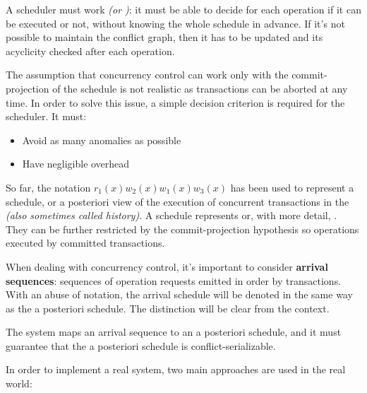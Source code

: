 \documentclass[english]{article}
\begin{document}
A scheduler must work  \textit{(or )}: it must be able to decide for each operation if it can be executed or not, without knowing the whole schedule in advance.
If it's not possible to maintain the conflict graph, then it has to be updated and its acyclicity checked after each operation.

The assumption that concurrency control can work only with the commit-projection of the schedule is not realistic as transactions can be aborted at any time.
In order to solve this issue, a simple decision criterion is required for the scheduler.
It must:

\begin{itemize}
  \item Avoid as many anomalies as possible
  \item Have negligible overhead
\end{itemize}

So far, the notation \(r_1(x) w_2(x) w_1(x) w_3(x)\) has been used to represent a schedule, or a posteriori view of the execution of concurrent transactions in the \DBMS \textit{(also sometimes called history)}.
A schedule represents  or, with more detail, .
They can be further restricted by the commit-projection hypothesis so operations executed by committed transactions.

When dealing with concurrency control, it's important to consider \textbf{arrival sequences}: sequences of operation requests emitted in order by transactions.
With an abuse of notation, the arrival schedule will be denoted in the same way as the a posteriori schedule.
The distinction will be clear from the context.

The \CC system maps an arrival sequence to an a posteriori schedule, and it must guarantee that the a posteriori schedule is conflict-serializable.

\bigskip

In order to implement a real \CC system, two main approaches are used in the real world:
\end{document}
